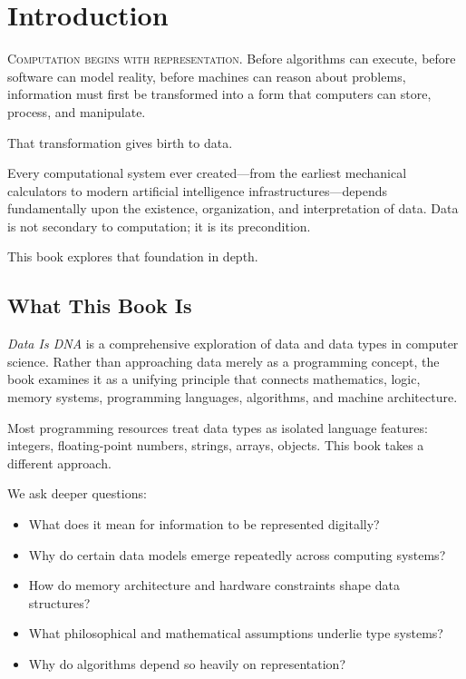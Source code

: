 \chapter*{Introduction}

\lettrine{C}{omputation begins with representation}. Before algorithms can execute, before software can model reality, before machines can reason about problems, information must first be transformed into a form that computers can store, process, and manipulate.

That transformation gives birth to data.

Every computational system ever created—from the earliest mechanical calculators to modern artificial intelligence infrastructures—depends fundamentally upon the existence, organization, and interpretation of data. Data is not secondary to computation; it is its precondition.

This book explores that foundation in depth.

\section*{What This Book Is}

\textit{Data Is DNA} is a comprehensive exploration of data and data types in computer science. Rather than approaching data merely as a programming concept, the book examines it as a unifying principle that connects mathematics, logic, memory systems, programming languages, algorithms, and machine architecture.

Most programming resources treat data types as isolated language features: integers, floating-point numbers, strings, arrays, objects. This book takes a different approach.

We ask deeper questions:

\begin{itemize}
	\item What does it mean for information to be represented digitally?
	\item Why do certain data models emerge repeatedly across computing systems?
	\item How do memory architecture and hardware constraints shape data structures?
	\item What philosophical and mathematical assumptions underlie type systems?
	\item Why do algorithms depend so heavily on representation?
\end{itemize}

